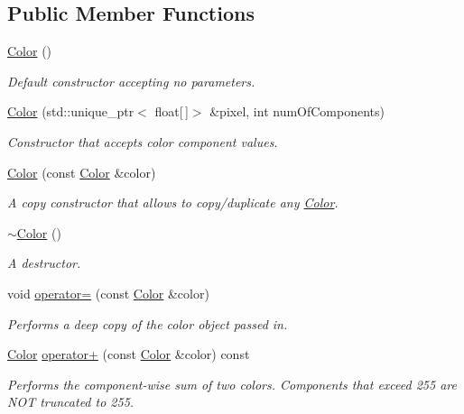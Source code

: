 \subsection*{Public Member Functions}
\begin{DoxyCompactItemize}
\item 
\mbox{\label{classColor_a9a742cbe9f9f4037f5d9f4e81a9b2428}} 
\hyperlink{classColor_a9a742cbe9f9f4037f5d9f4e81a9b2428}{Color} ()
\begin{DoxyCompactList}\small\item\em Default constructor accepting no parameters. \end{DoxyCompactList}\item 
\hyperlink{classColor_a18c0e82aae9dfe069aea5d2326ee4b4b}{Color} (std\+::unique\+\_\+ptr$<$ float\mbox{[}$\,$\mbox{]}$>$ \&pixel, int num\+Of\+Components)
\begin{DoxyCompactList}\small\item\em Constructor that accepts color component values. \end{DoxyCompactList}\item 
\hyperlink{classColor_a7b075d27e3bbdde7cbe648dc3b804261}{Color} (const \hyperlink{classColor}{Color} \&color)
\begin{DoxyCompactList}\small\item\em A copy constructor that allows to copy/duplicate any \hyperlink{classColor}{Color}. \end{DoxyCompactList}\item 
\mbox{\label{classColor_a3cfce6c6821d3bf489e26074c55378c0}} 
\hyperlink{classColor_a3cfce6c6821d3bf489e26074c55378c0}{$\sim$\+Color} ()
\begin{DoxyCompactList}\small\item\em A destructor. \end{DoxyCompactList}\item 
void \hyperlink{classColor_ac06dcf409ae64de5a67c7f6e69b6f44b}{operator=} (const \hyperlink{classColor}{Color} \&color)
\begin{DoxyCompactList}\small\item\em Performs a deep copy of the color object passed in. \end{DoxyCompactList}\item 
\hyperlink{classColor}{Color} \hyperlink{classColor_acd40b26ca2f9217b5cde1e5c1251ef04}{operator+} (const \hyperlink{classColor}{Color} \&color) const
\begin{DoxyCompactList}\small\item\em Performs the component-\/wise sum of two colors. Components that exceed 255 are N\+OT truncated to 255. \end{DoxyCompactList}\item 

\end{DoxyCompactItemize}
